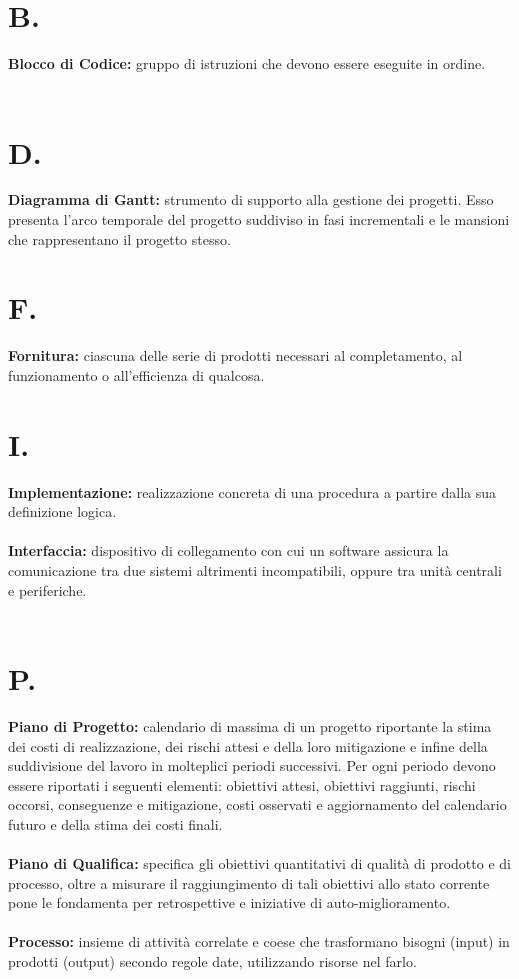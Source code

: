 \documentclass[a4paper, 12pt]{article}
\begin{document}
\makeindexdetails
\makefrontpage \makeversioni
\tableofcontents
\newpage
\clearpage
{}

\section{B.}
\textbf{Blocco di Codice:} gruppo di istruzioni che devono essere eseguite in ordine. \\ \\

\newpage
\section{D.}
\textbf{Diagramma di Gantt:} strumento di supporto alla gestione dei progetti. Esso presenta l'arco temporale del progetto suddiviso in fasi incrementali e le mansioni che rappresentano il progetto stesso. \\

\newpage
\section{F.}
\textbf{Fornitura:} ciascuna delle serie di prodotti necessari al completamento, al funzionamento o all'efficienza di qualcosa.

\newpage
\section{I.}
\textbf{Implementazione:} realizzazione concreta di una procedura a partire dalla sua definizione logica. \\ \\
\textbf{Interfaccia:} dispositivo di collegamento con cui un software assicura la comunicazione tra due sistemi altrimenti incompatibili, oppure tra unità centrali e periferiche. \\ \\
\newpage
\section{P.}
\textbf{Piano di Progetto:} calendario di massima di un progetto riportante la stima dei costi di realizzazione, dei rischi attesi e della loro mitigazione e infine della suddivisione del lavoro in molteplici periodi successivi. Per ogni periodo devono essere riportati i seguenti elementi: obiettivi attesi, obiettivi raggiunti, rischi occorsi, conseguenze e mitigazione, costi osservati e aggiornamento del calendario futuro e della stima dei costi finali. \\ \\
\textbf{Piano di Qualifica:} specifica gli obiettivi quantitativi di qualità di prodotto e di processo, oltre a misurare il raggiungimento di tali obiettivi allo stato corrente pone le fondamenta per retrospettive e iniziative di auto-miglioramento. \\ \\
\textbf{Processo:} insieme di attività correlate e coese che trasformano bisogni (input) in prodotti (output) secondo regole date, utilizzando risorse nel farlo. \\ \\
\end{document}
